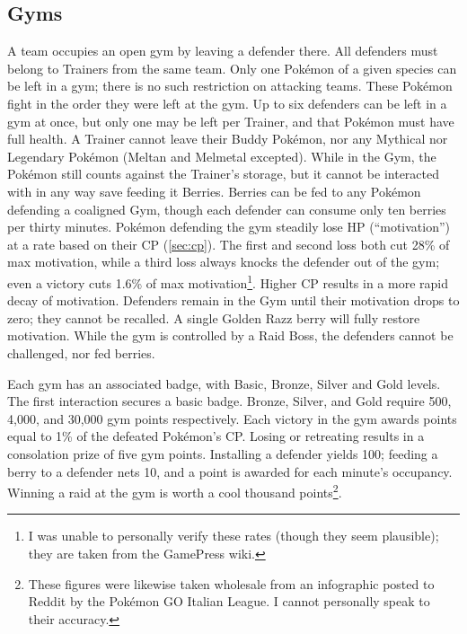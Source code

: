 \subsection{Gyms}
\label{sec:gyms}
A team occupies an open gym by leaving a defender there.
All defenders must belong to Trainers from the same team.
Only one Pokémon of a given species can be left in a gym; there is no
  such restriction on attacking teams.
These Pokémon fight in the order they were left at the gym.
Up to six defenders can be left in a gym at once, but only one
  may be left per Trainer, and that Pokémon must have full health.
A Trainer cannot leave their Buddy Pokémon, nor any Mythical nor Legendary
  Pokémon (Meltan and Melmetal excepted).
While in the Gym, the Pokémon still counts against the Trainer's storage,
  but it cannot be interacted with in any way save feeding it Berries.
Berries can be fed to any Pokémon defending a coaligned Gym, though
  each defender can consume only ten berries per thirty minutes.
Pokémon defending the gym steadily lose HP (``motivation'') at a rate
  based on their CP (\autoref{sec:cp}).
The first and second loss both cut 28\% of max motivation, while
  a third loss always knocks the defender out of the gym;
  even a victory cuts 1.6\% of max motivation\footnote{I was unable to personally verify these rates (though they seem plausible); they are taken from the GamePress wiki.}.
Higher CP results in a more rapid decay of motivation.
Defenders remain in the Gym until their motivation drops to zero; they cannot be recalled.
A single Golden Razz berry will fully restore motivation.
While the gym is controlled by a Raid Boss, the defenders cannot be challenged,
  nor fed berries.

Each gym has an associated badge, with Basic, Bronze, Silver and Gold levels.
The first interaction secures a basic badge.
Bronze, Silver, and Gold require 500, 4,000, and 30,000 gym points respectively.
Each victory in the gym awards points equal to 1\% of the defeated Pokémon's CP.
Losing or retreating results in a consolation prize of five gym points.
Installing a defender yields 100; feeding a berry to a defender nets 10,
 and a point is awarded for each minute's occupancy.
Winning a raid at the gym is worth a cool thousand points\footnote{These figures were likewise taken wholesale from an
 infographic posted to Reddit by the Pokémon GO Italian League. I cannot personally speak to their accuracy.}.

